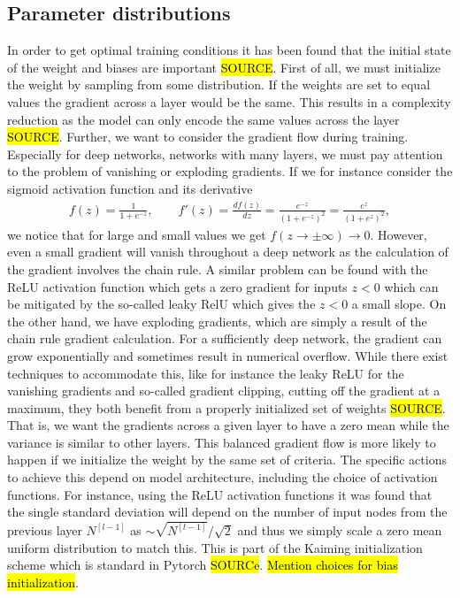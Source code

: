 \subsection{Parameter distributions}
In order to get optimal training conditions it has been found that the initial
state of the weight and biases are important \hl{SOURCE}. First of all, we must
initialize the weight by sampling from some distribution. If the weights are set
to equal values the gradient across a layer would be the same. This results in a
complexity reduction as the model can only encode the same values across the
layer \hl{SOURCE}. Further, we want to consider the gradient flow during training. Especially for deep networks, networks with many layers, we must pay attention to the problem of vanishing or exploding gradients. If we for instance consider the sigmoid activation function and its derivative 
\begin{align*}
  f(z) = \frac{1}{1 + e^{-z}}, \qquad f'(z) = \frac{df(z)}{dz} = \frac{e^{-z}}{(1+e^{-z})^2} = \frac{e^{z}}{(1+e^{z})^2},
\end{align*}
we notice that for large and small values we get $f(z\to \pm\infty) \to 0$.
However, even a small gradient will vanish throughout a deep network as the
calculation of the gradient involves the chain rule. A similar problem can be
found with the ReLU activation function which gets a zero gradient for inputs
$z<0$ which can be mitigated by the so-called leaky RelU which gives the $z<0$ a
small slope. On the other hand, we have exploding gradients, which are simply a
result of the chain rule gradient calculation. For a sufficiently deep network,
the gradient can grow exponentially and sometimes result in numerical overflow.
While there exist techniques to accommodate this, like for instance the leaky
ReLU for the vanishing gradients and so-called gradient clipping, cutting off
the gradient at a maximum, they both benefit from a properly initialized set of
weights \hl{SOURCE}. That is, we want the gradients across a given layer to have
a zero mean while the variance is similar to other layers. This balanced
gradient flow is more likely to happen if we initialize the weight by the same
set of criteria. The specific actions to achieve this depend on model architecture, including the choice of activation functions. For instance, using the ReLU activation functions it was found that the single standard deviation will depend on the number of input nodes from the previous layer $N^{[l-1]}$ as $\sim \sqrt{N^{[l-1]}}/\sqrt{2}$ and thus we simply scale a zero mean uniform distribution to match this.  This is part of the Kaiming initialization scheme which is standard in Pytorch \hl{SOURCe}. \hl{Mention choices for bias initialization}.


